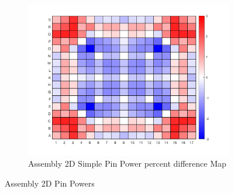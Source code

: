 \documentclass[12pt]{article}
\begin{document}
\begin{figure}[htb!]
        \label{fig:fig}
        \begin{subfigure}{\textwidth}
            \centering
            \includegraphics[scale=0.46]{Figures/2D_simple_pinpowerDiff.png}
            \caption{Assembly 2D Simple Pin Power percent difference Map}
            \label{fig:sub-firstA}
        \end{subfigure}
        \caption{Assembly 2D Pin Powers}
    \end{figure} 
    
 
 
\end{document}
